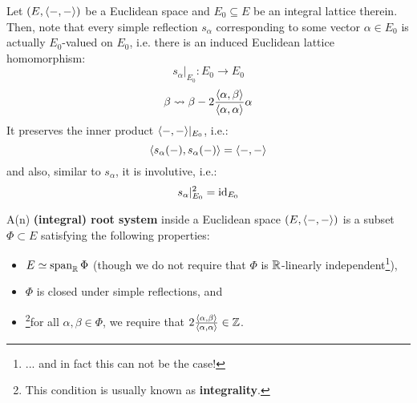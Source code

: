             \begin{remark} \label{remark: integral_simple_reflections}
                Let $(E, \langle-, -\rangle)$ be a Euclidean space and $E_0 \subseteq E$ be an integral lattice therein. Then, note that every simple reflection $s_{\alpha}$ corresponding to some vector $\alpha \in E_0$ is actually $E_0$-valued on $E_0$, i.e. there is an induced Euclidean lattice homomorphism:
                    $$s_{\alpha}|_{E_0}: E_0 \to E_0$$
                    $$\beta \leadsto \beta - 2\frac{\langle\alpha, \beta\rangle}{\langle\alpha, \alpha\rangle} \alpha$$
                It preserves the inner product $\langle-, -\rangle|_{E_0}$, i.e.:
                    $$\langle s_{\alpha}(-), s_{\alpha}(-)\rangle = \langle-, -\rangle$$
                and also, similar to $s_{\alpha}$, it is involutive, i.e.:
                    $$s_{\alpha}|_{E_0}^2 = \mathrm{id}_{E_0}$$
            \end{remark}
            \begin{definition} \label{def: root_systems}
                A(n) \textbf{(integral) root system} inside a Euclidean space $(E, \langle-, -\rangle)$ is a subset $\Phi \subset E$ satisfying the following properties:
                    \begin{itemize}
                        \item $E \simeq \operatorname{span}_{\mathbb{R}} \Phi$ (though we do not require that $\Phi$ is $\mathbb{R}$-linearly independent\footnote{... and in fact this can not be the case!}),
                        \item $\Phi$ is closed under simple reflections, and
                        \item \footnote{This condition is usually known as \textbf{integrality}.}for all $\alpha, \beta \in \Phi$, we require that $2\frac{\langle\alpha, \beta\rangle}{\langle\alpha, \alpha\rangle} \in \mathbb{Z}$.
                    \end{itemize}
            \end{definition}
